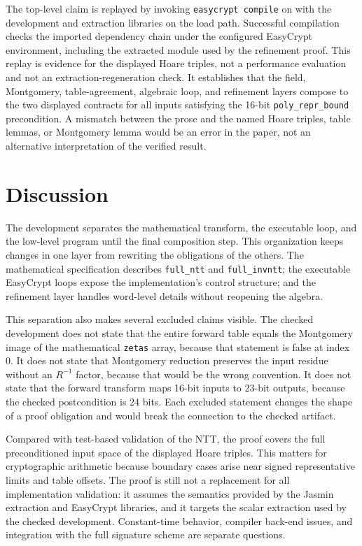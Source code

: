 \documentclass[10pt,twocolumn]{article}
\newcommand{\ec}{EasyCrypt}
\newcommand{\jasmin}{Jasmin}
\begin{document}
The top-level claim is replayed by invoking \texttt{easycrypt compile} on
 with the development and extraction libraries on the load
path. Successful compilation checks the imported dependency chain under the
configured \ec{} environment, including the extracted module used by the
refinement proof. This replay is evidence for the displayed Hoare triples, not
a performance evaluation and not an extraction-regeneration check. It
establishes that the field, Montgomery, table-agreement, algebraic loop, and
refinement layers compose to the two displayed contracts for all inputs
satisfying the 16-bit \texttt{poly\_repr\_bound} precondition. A mismatch between
the prose and the named Hoare triples, table lemmas, or Montgomery lemma would
be an error in the paper, not an alternative interpretation of the verified
result.

\section{Discussion}

The development separates the mathematical transform, the executable loop, and
the low-level program until the final composition step. This organization keeps
changes in one layer from rewriting the obligations of the others. The
mathematical specification describes \texttt{full\_ntt} and
\texttt{full\_invntt}; the executable \ec{} loops expose the implementation's
control structure; and the refinement layer handles word-level details without
reopening the algebra.

This separation also makes several excluded claims visible. The checked
development does not state that the entire forward table equals the Montgomery
image of the mathematical \texttt{zetas} array, because that statement is false
at index 0. It does not state that Montgomery reduction preserves the input
residue without an \(R^{-1}\) factor, because that would be the wrong convention.
It does not state that the forward transform maps 16-bit inputs to 23-bit
outputs, because the checked postcondition is 24 bits. Each excluded statement
changes the shape of a proof obligation and would break the connection to the
checked artifact.

Compared with test-based validation of the NTT, the proof covers the full
preconditioned input space of the displayed Hoare triples. This matters for
cryptographic arithmetic because boundary cases arise near signed
representative limits and table offsets. The proof is still not a replacement
for all implementation validation: it assumes the semantics provided by the
\jasmin{} extraction and \ec{} libraries, and it targets the scalar extraction
used by the checked development. Constant-time behavior, compiler back-end
issues, and integration with the full signature scheme are separate questions.
\end{document}
